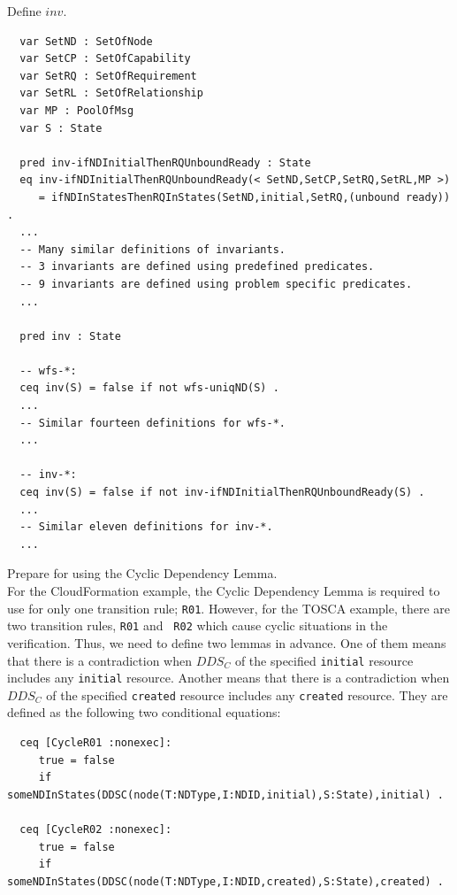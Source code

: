 \documentclass[12pt]{report}
\begin{document}
 Define $inv$. 
\small
\begin{verbatim}
  var SetND : SetOfNode
  var SetCP : SetOfCapability
  var SetRQ : SetOfRequirement
  var SetRL : SetOfRelationship
  var MP : PoolOfMsg
  var S : State

  pred inv-ifNDInitialThenRQUnboundReady : State
  eq inv-ifNDInitialThenRQUnboundReady(< SetND,SetCP,SetRQ,SetRL,MP >)
     = ifNDInStatesThenRQInStates(SetND,initial,SetRQ,(unbound ready)) .
  ...
  -- Many similar definitions of invariants.
  -- 3 invariants are defined using predefined predicates.
  -- 9 invariants are defined using problem specific predicates.
  ...

  pred inv : State

  -- wfs-*:
  ceq inv(S) = false if not wfs-uniqND(S) .
  ...
  -- Similar fourteen definitions for wfs-*.  
  ...

  -- inv-*:
  ceq inv(S) = false if not inv-ifNDInitialThenRQUnboundReady(S) .
  ...
  -- Similar eleven definitions for inv-*.  
  ...

\end{verbatim}
\normalsize

 Prepare for using the Cyclic Dependency
Lemma. \\
For the CloudFormation example, the Cyclic Dependency Lemma is
required to use for only one transition rule; {\tt R01}. However, for
the TOSCA example, there are two transition rules, {\tt R01} and {\tt
  R02} which cause cyclic situations in the verification. Thus, we
need to define two lemmas in advance.  One of them means that there is
a contradiction when $DDS_C$ of the specified {\tt initial} resource
includes any {\tt initial} resource.  Another means that there is a
contradiction when $DDS_C$ of the specified {\tt created} resource
includes any {\tt created} resource.  They are defined as the
following two conditional equations:
\small
\begin{verbatim}
  ceq [CycleR01 :nonexec]: 
     true = false
     if someNDInStates(DDSC(node(T:NDType,I:NDID,initial),S:State),initial) .

  ceq [CycleR02 :nonexec]: 
     true = false
     if someNDInStates(DDSC(node(T:NDType,I:NDID,created),S:State),created) .

\end{verbatim}
\normalsize
\end{document}
